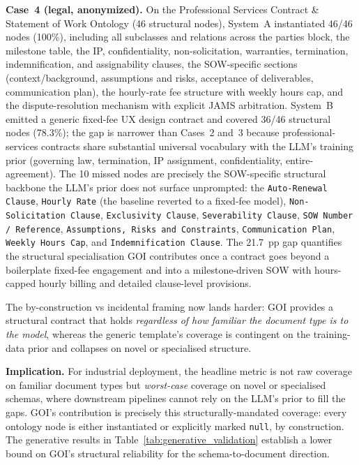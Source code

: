 \documentclass[runningheads,a4paper]{llncs}
\begin{document}
\medskip\noindent\textbf{Case~4 (legal, anonymized).} On the Professional Services
Contract \& Statement of Work Ontology (46 structural nodes),
System~A instantiated 46/46 nodes (100\%), including all subclasses
and relations across the parties block, the milestone table, the IP,
confidentiality, non-solicitation, warranties, termination,
indemnification, and assignability clauses, the SOW-specific sections
(context/background, assumptions and risks, acceptance of
deliverables, communication plan), the hourly-rate fee structure
with weekly hours cap, and the dispute-resolution mechanism with
explicit JAMS arbitration. System~B emitted a generic fixed-fee UX
design contract and covered 36/46 structural nodes (78.3\%); the gap
is narrower than Cases~2 and~3 because professional-services
contracts share substantial universal vocabulary with the LLM's
training prior (governing law, termination, IP assignment,
confidentiality, entire-agreement). The 10 missed nodes are
precisely the SOW-specific structural backbone the LLM's prior does
not surface unprompted: the \texttt{Auto-Renewal Clause},
\texttt{Hourly Rate} (the baseline reverted to a fixed-fee model),
\texttt{Non-Solicitation Clause}, \texttt{Exclusivity Clause},
\texttt{Severability Clause}, \texttt{SOW Number / Reference},
\texttt{Assumptions, Risks and Constraints}, \texttt{Communication
Plan}, \texttt{Weekly Hours Cap}, and \texttt{Indemnification
Clause}. The 21.7~pp gap quantifies the structural specialisation
GOI contributes once a contract goes beyond a boilerplate
fixed-fee engagement and into a milestone-driven SOW with
hours-capped hourly billing and detailed clause-level provisions.

The by-construction vs incidental framing now lands harder: GOI
provides a structural contract that holds \emph{regardless of how
familiar the document type is to the model}, whereas the generic
template's coverage is contingent on the training-data prior and
collapses on novel or specialised structure.

\medskip\noindent\textbf{Implication.} For industrial deployment, the headline
metric is not raw coverage on familiar document types but
\emph{worst-case} coverage on novel or specialised schemas, where
downstream pipelines cannot rely on the LLM's prior to fill the gaps.
GOI's contribution is precisely this structurally-mandated coverage: every
ontology node is either instantiated or explicitly marked
\texttt{null}, by construction. The generative results in
Table~\ref{tab:generative_validation} establish a lower bound on GOI's
structural reliability for the schema-to-document direction.
\end{document}

